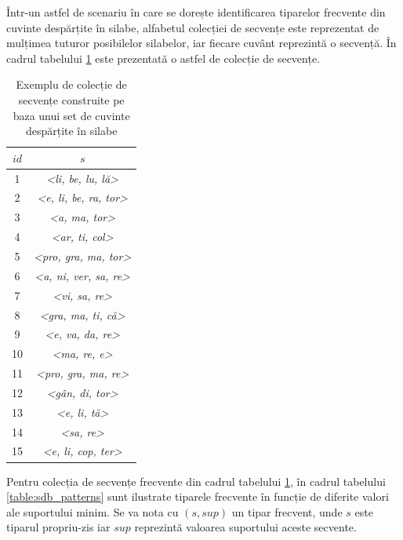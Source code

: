 \begin{ex}
Într-un astfel de scenariu în care se dorește identificarea tiparelor frecvente din cuvinte despărțite în silabe, alfabetul colecției de secvențe este reprezentat de mulțimea tuturor posibilelor silabelor, iar fiecare cuvânt reprezintă o secvență. În cadrul tabelului \ref{table:sdb_words} este prezentată o astfel de colecție de secvențe.
\end{ex}

\begin{table}[h]
\centering    
\begin{tabular}{|c|c|}    
\hline      
$id$ & $s$ \\
\hline
1 & \textit{<li, be, lu, lă>} \\
2 & \textit{<e, li, be, ra, tor>} \\
3 & \textit{<a, ma, tor>}\\
4 & \textit{<ar, ti, col>} \\
5 & \textit{<pro, gra, ma, tor>} \\
6 & \textit{<a, ni, ver, sa, re>} \\
7 & \textit{<vi, sa, re>} \\
8 & \textit{<gra, ma, ti, că>} \\
9 & \textit{<e, va, da, re>} \\
10 & \textit{<ma, re, e>} \\
11 & \textit{<pro, gra, ma, re>} \\
12 & \textit{<gân, di, tor>} \\
13 & \textit{<e, li, tă>} \\
14 & \textit{<sa, re>} \\
15 & \textit{<e, li, cop, ter>} \\
\hline                              
\end{tabular}
\caption{Exemplu de colecție de secvențe construite pe baza unui set de cuvinte despărțite în silabe}
\label{table:sdb_words}               
\end{table}

Pentru colecția de secvențe frecvente din cadrul tabelului \ref{table:sdb_words}, în cadrul tabelului \ref{table:sdb_patterns} sunt ilustrate tiparele frecvente în funcție de diferite valori ale suportului minim. Se va nota cu $(s,sup)$ un tipar frecvent, unde $s$ este tiparul propriu-zis iar $sup$ reprezintă valoarea suportului aceste secvente.

